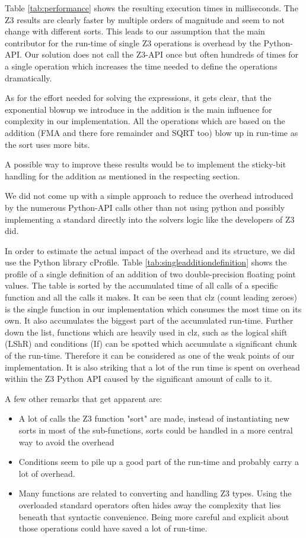 \documentclass[a4paper,UKenglish,cleveref, autoref, thm-restate]{lipics-v2019}
\begin{document}
Table \ref{tab:performance} shows the resulting execution times in milliseconds. The Z3 results are clearly faster by multiple orders of magnitude and seem to not change with different sorts. This leads to our assumption that the main contributor for the run-time of single Z3 operations is overhead by the Python-API. Our solution does not call the Z3-API once but often hundreds of times for a single operation which increases the time needed to define the operations dramatically.

As for the effort needed for solving the expressions, it gets clear, that the exponential blowup we introduce in the addition is the main influence for complexity in our implementation. All the operations which are based on the addition (FMA and there fore remainder and SQRT too) blow up in run-time as the sort uses more bits.

A possible way to improve these results would be to implement the sticky-bit handling for the addition as mentioned in the respecting section.

We did not come up with a simple approach to reduce the overhead introduced by the numerous Python-API calls other than not using python and possibly implementing a standard directly into the solvers logic like the developers of Z3 did.


In order to estimate the actual impact of the overhead and its structure, we did use the Python library cProfile. Table \ref{tab:singleadditiondefinition} shows the profile of a single definition of an addition of two double-precision floating point values. The table is sorted by the accumulated time of all calls of a specific function and all the calls it makes. It can be seen that clz (count leading zeroes) is the single function in our implementation which consumes the most time on its own. It also accumulates the biggest part of the accumulated run-time. 
Further down the list, functions which are heavily used in clz, such as the logical shift (LShR) and conditions (If) can be spotted which accumulate a significant chunk of the run-time.
Therefore it can be considered as one of the weak points of our implementation. It is also striking that a lot of the run time is spent on overhead within the Z3 Python API caused by the significant amount of calls to it.

A few other remarks that get apparent are:
\begin{itemize}
	\item A lot of calls the Z3 function "sort" are made, instead of instantiating new sorts in most of the sub-functions, sorts could be handled in a more central way to avoid the overhead
	\item Conditions seem to pile up a good part of the run-time and probably carry a lot of overhead.
	\item Many functions are related to converting and handling Z3 types. Using the overloaded standard operators often hides away the complexity that lies beneath that syntactic convenience. Being more careful and explicit about those operations could have saved a lot of run-time.
\end{itemize}
\end{document}
